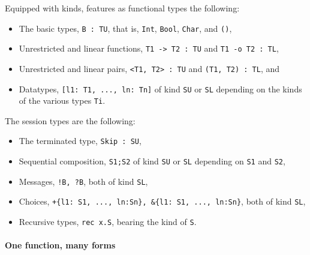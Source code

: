 Equipped with kinds, \freest{} features as functional types the
following:
%
\begin{itemize}
\item The basic types, \lstinline|B : TU|, that is, \lstinline|Int|,
  \lstinline|Bool|, \lstinline|Char|, and \lstinline|()|,
\item Unrestricted and linear functions, \lstinline|T1 -> T2 : TU| and
  \lstinline|T1 -o T2 : TL|,
\item Unrestricted and linear pairs, \lstinline|<T1, T2> : TU| and
  \lstinline|(T1, T2) : TL|, and
\item Datatypes, \lstinline|[l1: T1, ..., ln: Tn]| of kind
  \lstinline|SU| or \lstinline|SL| depending on the kinds of the
  various types \lstinline|Ti|.
\end{itemize}

The session types are the following:
\begin{itemize}
\item The terminated type, \lstinline|Skip : SU|,
\item Sequential composition, \lstinline|S1;S2| of kind \lstinline|SU|
  or \lstinline|SL| depending on \lstinline|S1| and \lstinline|S2|,
\item  Messages, \lstinline|!B, ?B|, both of kind \lstinline|SL|,
\item Choices, \lstinline|+{l1: S1, ..., ln:Sn}, &{l1: S1, ..., ln:Sn}|,
  both of kind \lstinline|SL|,
\item Recursive types, \lstinline|rec x.S|, bearing the kind of
  \lstinline|S|.
\end{itemize}

\paragraph{One function, many forms}

